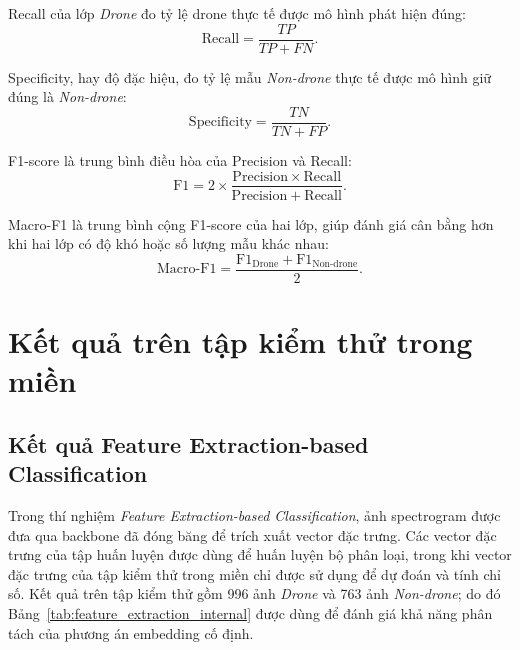 \documentclass[../DoAn.tex]{subfiles}
\begin{document}
Recall của lớp \textit{Drone} đo tỷ lệ drone thực tế được mô hình phát hiện đúng:
\begin{equation}
    \mathrm{Recall}
    =
    \frac{TP}{TP+FN}.
    \label{eq:recall_ch4}
\end{equation}

Specificity, hay độ đặc hiệu, đo tỷ lệ mẫu \textit{Non-drone} thực tế được mô hình giữ đúng là \textit{Non-drone}:
\begin{equation}
    \mathrm{Specificity}
    =
    \frac{TN}{TN+FP}.
    \label{eq:specificity_ch4}
\end{equation}

F1-score là trung bình điều hòa của Precision và Recall:
\begin{equation}
    \mathrm{F1}
    =
    2\times
    \frac{\mathrm{Precision}\times\mathrm{Recall}}
    {\mathrm{Precision}+\mathrm{Recall}}.
    \label{eq:f1_ch4}
\end{equation}

Macro-F1 là trung bình cộng F1-score của hai lớp, giúp đánh giá cân bằng hơn khi hai lớp có độ khó hoặc số lượng mẫu khác nhau:
\begin{equation}
    \mathrm{Macro\mbox{-}F1}
    =
    \frac{\mathrm{F1}_{\mathrm{Drone}}+\mathrm{F1}_{\mathrm{Non\text{-}drone}}}{2}.
    \label{eq:macro_f1_ch4}
\end{equation}

\section{Kết quả trên tập kiểm thử trong miền}

\subsection{Kết quả Feature Extraction-based Classification}

Trong thí nghiệm \textit{Feature Extraction-based Classification}, ảnh spectrogram được đưa qua backbone đã đóng băng để trích xuất vector đặc trưng. Các vector đặc trưng của tập huấn luyện được dùng để huấn luyện bộ phân loại, trong khi vector đặc trưng của tập kiểm thử trong miền chỉ được sử dụng để dự đoán và tính chỉ số. Kết quả trên tập kiểm thử gồm 996 ảnh \textit{Drone} và 763 ảnh \textit{Non-drone}; do đó Bảng~\ref{tab:feature_extraction_internal} được dùng để đánh giá khả năng phân tách của phương án embedding cố định.
\end{document}
